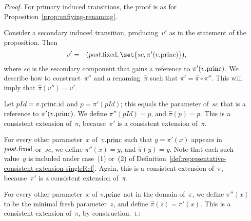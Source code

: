 \begin{proof}
For primary induced transitions, the proof is as for
Proposition~\ref{prop:unfiying-renaming}.

Consider a secondary induced transition, producing~$v'$ as in the statement of
the proposition.  Then
%
\begin{eqnarray*}
v' & = & (post.\fixed, \set{sc, \pi'(v.\princ)}),
\end{eqnarray*}
%
where $sc$ is the secondary component that gains a reference to
$\pi'(v.\mathrm{princ})$.  We describe how to construct~$\pi''$ and a
renaming~$\hat\pi$ such that $\pi' = \hat\pi \circ \pi''$.  This will imply
that $\hat\pi(v'') = v'$.

Let $pId = v.\mathrm{princ}.\mathrm{id}$ and $p = \pi'(pId)$; this equals the parameter
of~$sc$ that is a reference to $\pi'(v.\mathrm{princ})$.  We define $\pi''(pId) = p$,
and $\hat\pi(p) = p$.  This is a consistent extension of~$\pi$, because~$\pi'$
is a consistent extension of~$\pi$.

For every other parameter~$x$ of~$v.\mathrm{princ}$ such that $y = \pi'(x)$ appears
in~$post.\mathrm{fixed}$ or~$sc$,  we define $\pi''(x) = y$, and $\hat\pi(y) = y$.
Note that each such value~$y$ is included under case~(1) or~(2) of
Definition~\ref{def:representative-consistent-extension-singleRef}.  Again,
this is a consistent extension of~$\pi$, because~$\pi'$ is a consistent
extension of~$\pi$.

For every other parameter~$x$ of $v.\mathrm{princ}$ not in the domain of~$\pi$, we
define $\pi''(x)$ to be the minimal fresh parameter~$z$, and define
$\hat\pi(z) = \pi'(x)$.  This is a consistent extension of~$\pi$, by
construction.
\end{proof}


